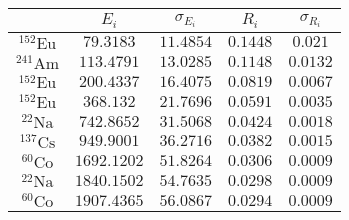 \begin{tabular}{| c | c | c | c | c |}
\hline
{} & $E_i$ & $\sigma_{E_i}$ & $R_i$ & $\sigma_{R_i}$\\
\hline
$^{152}\text{Eu}$ & $79.3183$ & $11.4854$ & $0.1448$ & $0.021$\\
\hline
$^{241}\text{Am}$ & $113.4791$ & $13.0285$ & $0.1148$ & $0.0132$\\
\hline
$^{152}\text{Eu}$ & $200.4337$ & $16.4075$ & $0.0819$ & $0.0067$\\
\hline
$^{152}\text{Eu}$ & $368.132$ & $21.7696$ & $0.0591$ & $0.0035$\\
\hline
$^{22}\text{Na}$ & $742.8652$ & $31.5068$ & $0.0424$ & $0.0018$\\
\hline
$^{137}\text{Cs}$ & $949.9001$ & $36.2716$ & $0.0382$ & $0.0015$\\
\hline
$^{60}\text{Co}$ & $1692.1202$ & $51.8264$ & $0.0306$ & $0.0009$\\
\hline
$^{22}\text{Na}$ & $1840.1502$ & $54.7635$ & $0.0298$ & $0.0009$\\
\hline
$^{60}\text{Co}$ & $1907.4365$ & $56.0867$ & $0.0294$ & $0.0009$\\
\hline
\end{tabular}
